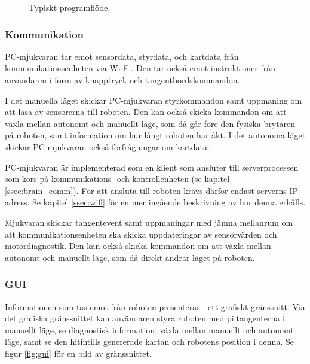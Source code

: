 \documentclass[a4paper,11pt]{article}
\begin{document}
\begin{figure}[h!]
\caption{Typiskt programflöde.}
\label{fig:gui_flowchart}
\end{figure}

\subsubsection{Kommunikation}\label{ssec:pc_comm}
PC-mjukvaran tar emot sensordata, styrdata, och kartdata från kommunikationsenheten via Wi-Fi. Den tar också emot instruktioner från användaren i form av knapptryck och tangentbordskommandon.

I det manuella läget skickar PC-mjukvaran styrkommandon samt uppmaning om att läsa av sensorerna till roboten. Den kan också skicka kommandon om att växla mellan autonomt och manuellt läge, som då går före den fysiska brytaren på roboten, samt information om hur långt roboten har åkt. I det autonoma läget skickar PC-mjukvaran också förfrågningar om kartdata.

PC-mjukvaran är implementerad som en klient som ansluter till serverprocessen som körs på kommunikations- och kontrollenheten (se kapitel \ref{ssec:brain_comm}). För att ansluta till roboten krävs därför endast serverns IP-adress. Se kapitel \ref{ssec:wifi} för en mer ingående beskrivning av hur denna erhålls.

Mjukvaran skickar tangentevent samt uppmaningar med jämna mellanrum om att kommunikationsenheten ska skicka uppdateringar av sensorvärden och motordiagnostik. Den kan också skicka kommandon om att växla mellan autonomt och manuellt läge, som då direkt ändrar läget på roboten.

\subsubsection{GUI}
Informationen som tas emot från roboten presenteras i ett grafiskt gränssnitt. Via det grafiska gränssnittet kan användaren styra roboten med piltangenterna i manuellt läge, se diagnostisk information, växla mellan manuellt och autonomt läge, samt se den hitintills genererade kartan och robotens position i denna. Se figur \ref{fig:gui} för en bild av gränssnittet.
\end{document}
